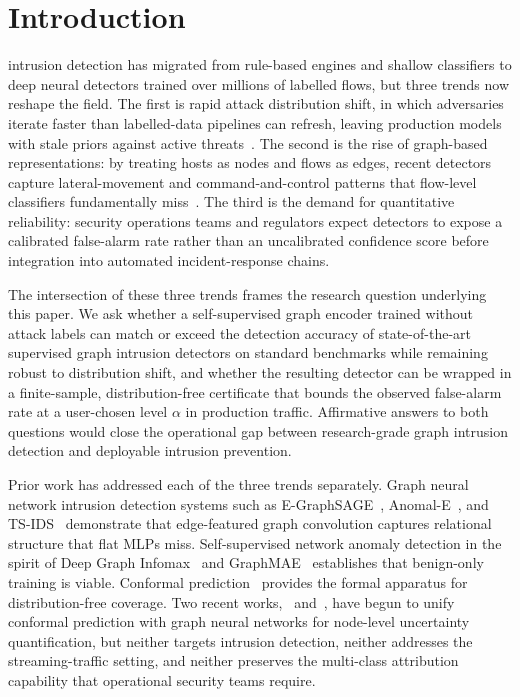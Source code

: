 \documentclass{ieeeaccess}
\begin{document}
\section{Introduction}
 intrusion detection has migrated from rule-based
engines and shallow classifiers to deep neural detectors trained over
millions of labelled flows, but three trends now reshape the field. The
first is rapid attack distribution shift, in which adversaries iterate
faster than labelled-data pipelines can refresh, leaving production models
with stale priors against active threats~\cite{layeghy2023,bilot2023survey}.
The second is the rise of graph-based representations: by treating hosts as
nodes and flows as edges, recent detectors capture lateral-movement and
command-and-control patterns that flow-level classifiers fundamentally
miss~\cite{lo2022egraphsage,caville2022anomale}. The third is the demand
for quantitative reliability: security operations teams and regulators
expect detectors to expose a calibrated false-alarm rate rather than an
uncalibrated confidence score before integration into automated
incident-response chains.

The intersection of these three trends frames the research question
underlying this paper. We ask whether a self-supervised graph encoder
trained without attack labels can match or exceed the detection accuracy
of state-of-the-art supervised graph intrusion detectors on standard
benchmarks while remaining robust to distribution shift, and whether the
resulting detector can be wrapped in a finite-sample, distribution-free
certificate that bounds the observed false-alarm rate at a user-chosen
level $\alpha$ in production traffic. Affirmative answers to both
questions would close the operational gap between
research-grade graph intrusion detection and deployable
intrusion prevention.

Prior work has addressed each of the three trends separately. Graph neural
network intrusion detection systems such as E-GraphSAGE~\cite{lo2022egraphsage},
Anomal-E~\cite{caville2022anomale}, and TS-IDS~\cite{nguyen2023tsids}
demonstrate that edge-featured graph convolution captures relational
structure that flat MLPs miss. Self-supervised network anomaly detection
in the spirit of Deep Graph Infomax~\cite{velickovic2019dgi} and
GraphMAE~\cite{hou2022graphmae} establishes that benign-only training is
viable. Conformal prediction~\cite{vovk2022alrw,angelopoulos2023gentle}
provides the formal apparatus for distribution-free coverage. Two recent
works,~\cite{huang2023cfgnn} and~\cite{zargarbashi2023daps}, have begun to
unify conformal prediction with graph neural networks for node-level
uncertainty quantification, but neither targets intrusion detection, neither
addresses the streaming-traffic setting, and neither preserves the
multi-class attribution capability that operational security teams require.
\end{document}
